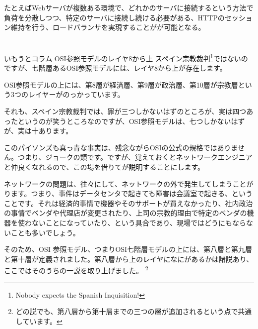 たとえばWebサーバが複数ある環境で、どれかのサーバに接続するという方法で負荷を分散しつつ、特定のサーバに接続し続ける必要がある、HTTPのセッション維持を行う、ロードバランサを実現することがが可能となる。



\section*{}
\begin{itembox}[l]{いもうとコラム OSI参照モデルのレイヤ8から上}
スペイン宗教裁判\footnote{Nobody expects the Spanish Inquisition!}ではないのですが、七階層あるOSI参照モデルには、レイヤ8から上が存在します。

OSI参照モデルの上には、第8層が経済層、第9層が政治層、第10層が宗教層という3つのレイヤーがのっかっています。


それも、スペイン宗教裁判では、罪が三つしかないはずのところが、実は四つあったというのが笑うところなのですが、OSI参照モデルは、七つしかないはずが、実は十あります。

このパイソンズも真っ青な事実は、残念ながらOSIの公式の規格ではありません。つまり、ジョークの類です。ですが、覚えておくとネットワークエンジニアと仲良くなれるので、この場を借りてが説明することにします。

ネットワークの問題は、往々にして、ネットワークの外で発生してしまうことがります。つまり、事件はデータセンタで起きても障害は会議室で起きる、ということです。それは経済的事情で機器やそのサポートが買えなかったり、社内政治の事情でベンダや代理店が変更されたり、上司の宗教的理由で特定のベンダの機器を使わないことになっていたり、という具合であり、現場ではどうにもならないことも多いでしょう。

そのため、OSI 参照モデル、つまりOSI七階層モデルの上には、第八層と第九層と第十層が定義されました。第八層から上のレイヤになにがあるかは諸説あり、ここではそのうちの一説を取り上げました。
\footnote{どの説でも、第八層から第十層までの三つの層が追加されるという点で共通しています。}


\end{itembox}

